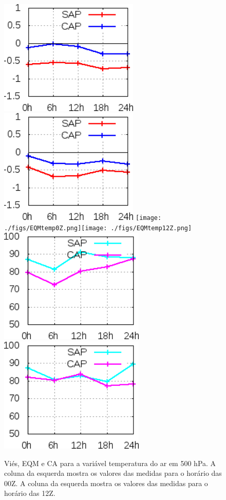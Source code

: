 \begin{figure}[!hbp]
\includegraphics[height=5.5cm]{./figs/VIES500temp0Z.png}\includegraphics[height=5.5cm]{./figs/VIES500temp12Z.png}
\texttt{[image: ./figs/EQMtemp0Z.png]}\texttt{[image: ./figs/EQMtemp12Z.png]}
\includegraphics[height=5.5cm]{./figs/CA500temp0Z.png}\includegraphics[height=5.5cm]{./figs/CA500temp12Z.png}
\caption{Viés, EQM e CA para a variável temperatura do ar em 500 hPa. A coluna da esquerda mostra os valores das medidas para o horário das 00Z. A coluna da esquerda mostra os valores das medidas para o horário das 12Z.}
\label{fig56}
\end{figure}

